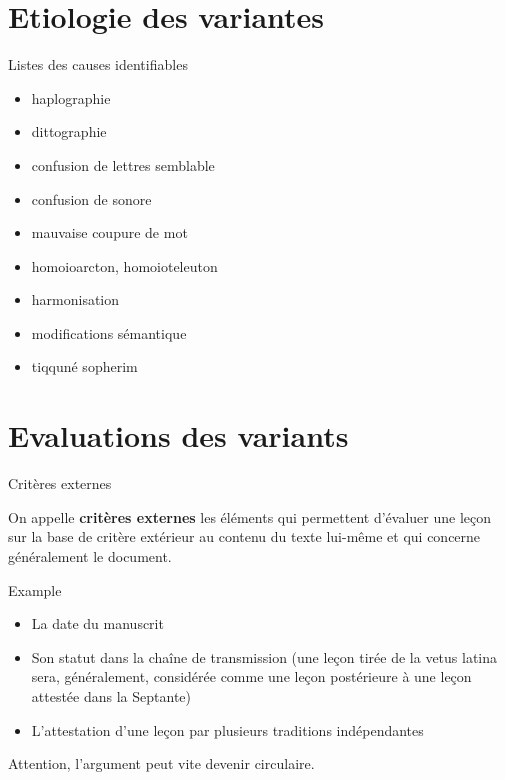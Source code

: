 \documentclass[11pt]{beamer}
\begin{document}
\begin{frame}
	\titlepage
\end{frame}

\section{Etiologie des variantes}

\begin{frame}{Listes des causes identifiables}

\begin{bloc}{}
    \begin{itemize}
        \item haplographie
        \item dittographie
        \item confusion de lettres semblable
        \item confusion de sonore
        \item mauvaise coupure de mot
        \item homoioarcton, homoioteleuton
        \item harmonisation
        \item modifications sémantique
        \item tiqquné sopherim
    \end{itemize}
\end{bloc}
    
\end{frame}

\section{Evaluations des variants}

\begin{frame}{Critères externes}
    \begin{definition}
        On appelle \textbf{critères externes} les éléments  qui permettent d'évaluer une leçon sur la base de critère extérieur au contenu du texte lui-même et qui concerne généralement le document. 
    \end{definition}

    \begin{exampleblock}{Example}
        \begin{itemize}
            \item La date du manuscrit
            \item Son statut dans la chaîne de transmission (une leçon tirée de la vetus latina sera, généralement, considérée comme une leçon postérieure à une leçon attestée dans la Septante)
            \item L'attestation d'une leçon par plusieurs traditions indépendantes
        \end{itemize}
    \end{exampleblock}

    \begin{alertblock}{}
        Attention, l'argument peut vite devenir circulaire.
    \end{alertblock}
\end{frame}
\end{document}
